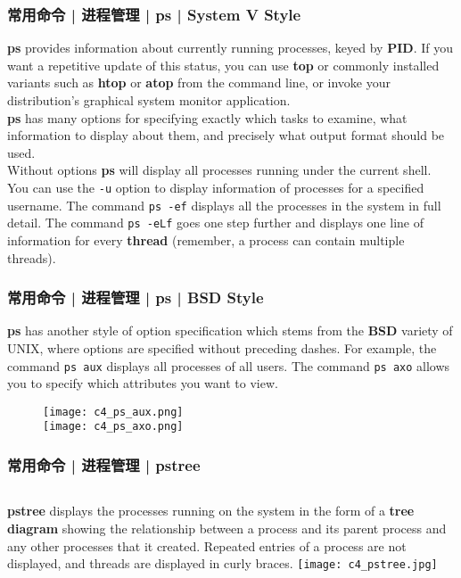 \begin{frame}[fragile]
  \frametitle{常用命令 | 进程管理 | ps | System V Style}
  \textbf{ps} provides information about currently running processes, keyed by \textbf{PID}. If you want a repetitive update of this status, you can use \textbf{top} or commonly installed variants such as \textbf{htop} or \textbf{atop} from the command line, or invoke your distribution's graphical system monitor application.\\
  \vspace{0.2cm}
  \textbf{ps} has many options for specifying exactly which tasks to examine, what information to display about them, and precisely what output format should be used.\\
  \vspace{0.2cm}
  Without options \textbf{ps} will display all processes running under the current shell. You can use the \verb|-u| option to display information of processes for a specified username. The command \verb|ps -ef| displays all the processes in the system in full detail. The command \verb|ps -eLf| goes one step further and displays one line of information for every \textbf{thread} (remember, a process can contain multiple threads).
\end{frame}

\begin{frame}[fragile]
  \frametitle{常用命令 | 进程管理 | ps | BSD Style}
  \textbf{ps} has another style of option specification which stems from the \textbf{BSD} variety of UNIX, where options are specified without preceding dashes.  For example, the command \verb|ps aux| displays all processes of all users. The command \verb|ps axo| allows you to specify which attributes you want to view.
  \begin{figure}
    \centering
    \texttt{[image: c4\_ps\_aux.png]}\\
    \texttt{[image: c4\_ps\_axo.png]}
  \end{figure}
\end{frame}

\begin{frame}
  \frametitle{常用命令 | 进程管理 | pstree}
  \begin{columns}
  \textbf{pstree} displays the processes running on the system in the form of a \textbf{tree diagram} showing the relationship between a process and its parent process and any other processes that it created. Repeated entries of a process are not displayed, and threads are displayed in curly braces.
    \texttt{[image: c4\_pstree.jpg]}
  \end{columns}
\end{frame}

